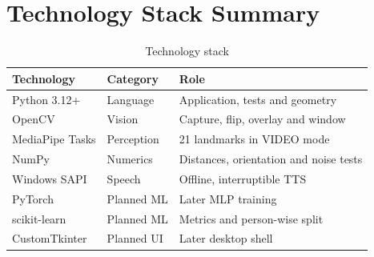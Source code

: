 \section{Technology Stack Summary}
\begin{table}[H]
\centering
\small
\caption{Technology stack}
\label{tab:stack}
\begin{tabularx}{\textwidth}{@{}>{\raggedright\arraybackslash}p{3.2cm} >{\raggedright\arraybackslash}p{2.6cm} L@{}}
\toprule
\textbf{Technology} & \textbf{Category} & \textbf{Role} \\
\midrule
Python 3.12+ & Language & Application, tests and geometry \\
OpenCV \cite{opencv} & Vision & Capture, flip, overlay and window \\
MediaPipe Tasks \cite{mediapipehl} & Perception & 21 landmarks in VIDEO mode \\
NumPy & Numerics & Distances, orientation and noise tests \\
Windows SAPI \cite{sapi} & Speech & Offline, interruptible TTS \\
PyTorch \cite{pytorch} & Planned ML & Later MLP training \\
scikit-learn & Planned ML & Metrics and person-wise split \\
CustomTkinter & Planned UI & Later desktop shell \\
\bottomrule
\end{tabularx}
\end{table}

